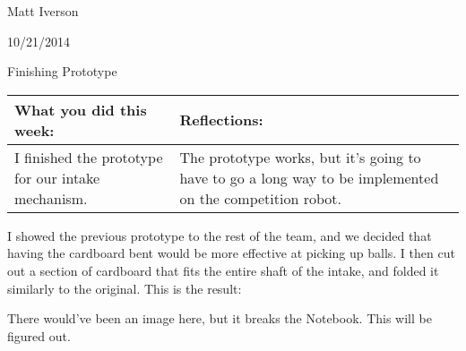 Matt Iverson

10/21/2014

Finishing Prototype

\begin{tabular}{|p{5cm}|p{5cm}|}
 \hline
 What you did this week: &
 Reflections: \\
 \hline
 I finished the prototype for our intake mechanism.
 &
 The prototype works, but it’s going to have to go a long way to be implemented on the competition robot.
 \\
 \hline
\end{tabular}

I showed the previous prototype to the rest of the team, and we decided that having the cardboard bent would be more effective at picking up balls. I then cut out a section of cardboard that fits the entire shaft of the intake, and folded it similarly to the original. This is the result: 

There would've been an image here, but it breaks the Notebook. This will be figured out.


